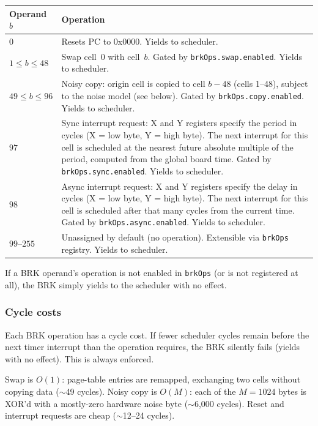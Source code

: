\documentclass{article}
\begin{document}
\begin{itemize}
\begin{itemize}
      \begin{tabular}{l|p{}}
        Operand $b$ & Operation \\ \hline
        0 & Resets PC to 0x0000. Yields to scheduler. \\
        $1 \leq b \leq 48$ & Swap cell~0 with cell~$b$.
          Gated by \texttt{brkOps.swap.enabled}.
          Yields to scheduler. \\
        $49 \leq b \leq 96$ & Noisy copy: origin cell is copied to cell $b - 48$
          (cells 1--48), subject to the noise model (see below).
          Gated by \texttt{brkOps.copy.enabled}.
          Yields to scheduler. \\
        $97$ & Sync interrupt request: X and Y registers specify the period
          in cycles (X = low byte, Y = high byte). The next interrupt for this
          cell is scheduled at the nearest future absolute multiple of the period,
          computed from the global board time.
          Gated by \texttt{brkOps.sync.enabled}.
          Yields to scheduler. \\
        $98$ & Async interrupt request: X and Y registers specify the delay
          in cycles (X = low byte, Y = high byte). The next interrupt for this
          cell is scheduled after that many cycles from the current time.
          Gated by \texttt{brkOps.async.enabled}.
          Yields to scheduler. \\
        $99$--$255$ & Unassigned by default (no operation). Extensible via
          \texttt{brkOps} registry. Yields to scheduler.
      \end{tabular}

      If a BRK operand's operation is not enabled in \texttt{brkOps} (or is not
      registered at all), the BRK simply yields to the scheduler with no effect.

      \subsubsection*{Cycle costs}

      Each BRK operation has a cycle cost. If fewer scheduler cycles remain
      before the next timer interrupt than the operation requires, the
      BRK silently fails (yields with no effect). This is always enforced.

      Swap is $O(1)$: page-table entries are remapped, exchanging
      two cells without copying data ($\sim$49 cycles).
      Noisy copy is $O(M)$: each of the $M = 1024$ bytes is XOR'd with
      a mostly-zero hardware noise byte ($\sim$6{,}000 cycles).
      Reset and interrupt requests are cheap ($\sim$12--24 cycles).


\end{itemize}
\end{itemize}
\end{document}

